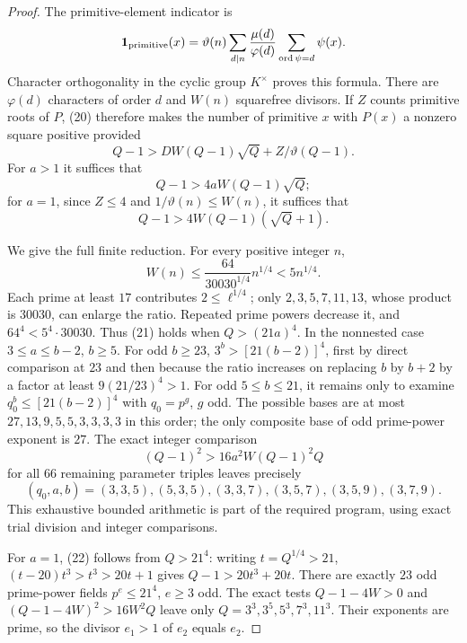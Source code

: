 \begin{proof}
The primitive-element indicator is
\[
 {\bf1}_{\rm primitive}(x)=\vartheta(n)
 \sum_{d\mid n}\frac{\mu(d)}{\varphi(d)}
       \sum_{\operatorname{ord}\psi=d}\psi(x).
\]
Character orthogonality in the cyclic group $K^\times$ proves this
formula. There are $\varphi(d)$ characters of order $d$ and $W(n)$
squarefree divisors. If $Z$ counts primitive roots of $P$, (20) therefore
makes the number of primitive $x$ with $P(x)$ a nonzero square positive
provided
\[
 Q-1>D W(Q-1)\sqrt Q+Z/\vartheta(Q-1).
\]
For $a>1$ it suffices that
\[
 Q-1>4aW(Q-1)\sqrt Q;                                    \tag{21}
\]
for $a=1$, since $Z\le4$ and $1/\vartheta(n)\le W(n)$, it suffices that
\[
 Q-1>4W(Q-1)(\sqrt Q+1).                                 \tag{22}
\]

We give the full finite reduction. For every positive integer $n$,
\[
 W(n)\le \frac{64}{30030^{1/4}}n^{1/4}<5n^{1/4}.
\]
Each prime at least $17$ contributes $2\le\ell^{1/4}$; only
$2,3,5,7,11,13$, whose product is $30030$, can enlarge the ratio.
Repeated prime powers decrease it, and $64^4<5^4\cdot30030$.
Thus (21) holds when $Q>(21a)^4$.
In the nonnested case $3\le a\le b-2$, $b\ge5$. For odd $b\ge23$,
$3^b>[21(b-2)]^4$, first by direct comparison at $23$ and then because
the ratio increases on replacing $b$ by $b+2$ by a factor at least
$9(21/23)^4>1$. For odd $5\le b\le21$, it remains only to examine
$q_0^b\le[21(b-2)]^4$ with $q_0=p^g$, $g$ odd.
The possible bases are at most $27,13,9,5,5,3,3,3,3$ in this order;
the only composite base of odd prime-power exponent is $27$.
The exact integer comparison
\[
 (Q-1)^2>16a^2W(Q-1)^2Q
\]
for all $66$ remaining parameter triples leaves precisely
\[
 (q_0,a,b)=(3,3,5),(5,3,5),(3,3,7),(3,5,7),(3,5,9),(3,7,9).
\]
This exhaustive bounded arithmetic is part of the required program,
using exact trial division and integer comparisons.

For $a=1$, (22) follows from $Q>21^4$: writing $t=Q^{1/4}>21$,
$(t-20)t^3>t^3>20t+1$ gives $Q-1>20t^3+20t$.
There are exactly $23$ odd prime-power fields $p^e\le21^4$, $e\ge3$
odd. The exact tests $Q-1-4W>0$ and
$(Q-1-4W)^2>16W^2Q$ leave only $Q=3^3,3^5,5^3,7^3,11^3$.
Their exponents are prime, so the divisor $e_1>1$ of $e_2$ equals $e_2$.


\end{proof}
